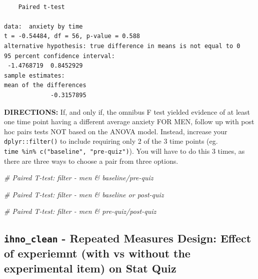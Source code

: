 \documentclass[]{article}
\newenvironment{Shaded}{\begin{snugshade}}{\end{snugshade}}
\newcommand{\CommentTok}[1]{\textcolor[rgb]{0.56,0.35,0.01}{\textit{#1}}}
\begin{document}
\begin{verbatim}

    Paired t-test

data:  anxiety by time
t = -0.54484, df = 56, p-value = 0.588
alternative hypothesis: true difference in means is not equal to 0
95 percent confidence interval:
 -1.4768719  0.8452929
sample estimates:
mean of the differences 
             -0.3157895 
\end{verbatim}

\clearpage

\textbf{DIRECTIONS:} If, and only if, the omnibus F test yielded
evidence of at least one time point having a different average anxiety
FOR MEN, follow up with post hoc pairs tests NOT based on the ANOVA
model. Instead, increase your \texttt{dplyr::filter()} to include
requiring only 2 of the 3 time points (eg.
\texttt{time\ \%in\%\ c("baseline",\ "pre-quiz")}). You will have to do
this 3 times, as there are three ways to choose a pair from three
options.

\begin{Shaded}
\begin{Highlighting}[]
\CommentTok{# Paired T-test: filter - men & baseline/pre-quiz}
\end{Highlighting}
\end{Shaded}

\begin{Shaded}
\begin{Highlighting}[]
\CommentTok{# Paired T-test: filter - men & baseline or post-quiz}
\end{Highlighting}
\end{Shaded}

\begin{Shaded}
\begin{Highlighting}[]
\CommentTok{# Paired T-test: filter - men & pre-quiz/post-quiz}
\end{Highlighting}
\end{Shaded}

\clearpage

\subsection{\texorpdfstring{\texttt{ihno\_clean} - Repeated Measures
Design: Effect of experiemnt (with vs without the experimental item) on
Stat
Quiz}{ihno\_clean - Repeated Measures Design: Effect of experiemnt (with vs without the experimental item) on Stat Quiz}}\label{ihno_clean---repeated-measures-design-effect-of-experiemnt-with-vs-without-the-experimental-item-on-stat-quiz}
\end{document}
